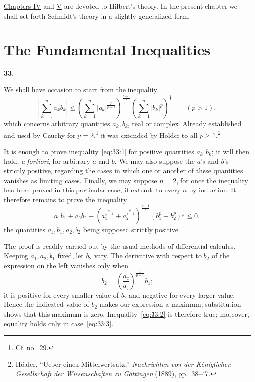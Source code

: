 \documentclass[
  paper=b5,
  fontsize=13pt,
  twoside=true,
  open=any,
  bookmarkpackage=false,
  chapterprefix=true,
  headings=normal
]{scrbook}
\theoremstyle{definition}
\newcommand{\numberedparagraph}[1]{%
  \par\medskip\phantomsection\label{sec:#1}%
  \noindent\textbf{#1.}\enspace
}
\begin{document}
\hyperref[chap:4]{Chapters IV} and \hyperref[chap:5]{V} are devoted to Hilbert's theory. In the present chapter we shall set forth Schmidt's theory in a slightly generalized form.

\section{The Fundamental Inequalities}

\numberedparagraph{33}
We shall have occasion to start from the inequality
\begin{equation}
 \left|\sum_{k=1}^{n}a_kb_k\right|
 \leq
 \left(\sum_{k=1}^{n}|a_k|^{\frac{p}{p-1}}\right)^{\frac{p-1}{p}}
 \left(\sum_{k=1}^{n}|b_k|^p\right)^{\frac1p}
 \qquad (p>1),
 \tag{1}\label{eq:33:1}
\end{equation}
which concerns arbitrary quantities $a_k,b_k$, real or complex. Already established and used by Cauchy for $p=2$,\footnote{Cf. \hyperref[sec:29]{no.~29}.} it was extended by H\"older to all $p>1$.\footnote{H\"older, ``Ueber einen Mittelwertsatz,'' \emph{Nachrichten von der K\"oniglichen Gesellschaft der Wissenschaften zu G\"ottingen} (1889), pp.~38--47.}

It is enough to prove inequality~\eqref{eq:33:1} for positive quantities $a_k,b_k$; it will then hold, \emph{a fortiori}, for arbitrary $a$ and $b$. We may also suppose the $a$'s and $b$'s strictly positive, regarding the cases in which one or another of these quantities vanishes as limiting cases. Finally, we may suppose $n=2$, for once the inequality has been proved in this particular case, it extends to every $n$ by induction. It therefore remains to prove the inequality
\begin{equation}
 a_1b_1+a_2b_2
 -\left(a_1^{\frac{p}{p-1}}+a_2^{\frac{p}{p-1}}\right)^{\frac{p-1}{p}}
  \left(b_1^p+b_2^p\right)^{\frac1p}
 \leq0,
 \tag{2}\label{eq:33:2}
\end{equation}
the quantities $a_1,b_1,a_2,b_2$ being supposed strictly positive.

The proof is readily carried out by the usual methods of differential calculus. Keeping $a_1,a_2,b_1$ fixed, let $b_2$ vary. The derivative with respect to $b_2$ of the expression on the left vanishes only when
\begin{equation}
 b_2=\left(\frac{a_2}{a_1}\right)^{\frac1{p-1}}b_1;
 \tag{3}\label{eq:33:3}
\end{equation}
it is positive for every smaller value of $b_2$ and negative for every larger value. Hence the indicated value of $b_2$ makes our expression a maximum; substitution shows that this maximum is zero. Inequality~\eqref{eq:33:2} is therefore true; moreover, equality holds only in case~\eqref{eq:33:3}.
\end{document}

